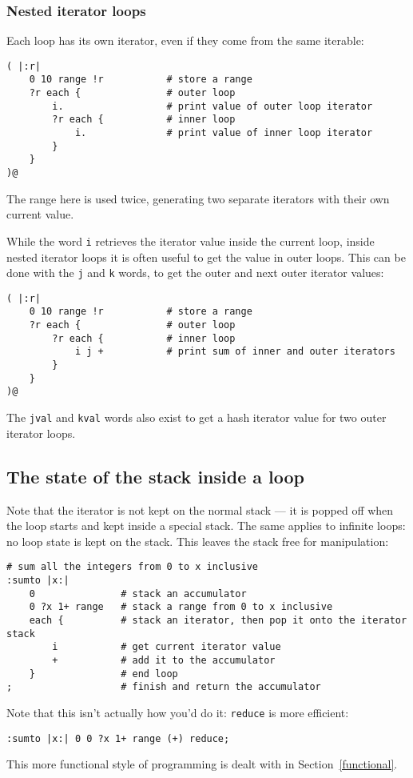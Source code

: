 \subsubsection{Nested iterator loops}
\label{nestit}
Each loop has its own iterator, even if they come from the same iterable:
\begin{lstlisting}
( |:r|
    0 10 range !r           # store a range
    ?r each {               # outer loop
        i.                  # print value of outer loop iterator
        ?r each {           # inner loop
            i.              # print value of inner loop iterator
        }
    }
)@
\end{lstlisting}
The range here is used twice, generating two separate iterators with
their own current value.

While the word \texttt{i} retrieves the iterator value inside the current
loop, inside nested iterator loops it is often useful to get the value
in outer loops. This can be done with the \texttt{j} and \texttt{k} words,
to get the outer and next outer iterator values:
\begin{lstlisting}
( |:r|
    0 10 range !r           # store a range
    ?r each {               # outer loop
        ?r each {           # inner loop
            i j +           # print sum of inner and outer iterators
        }
    }
)@  
\end{lstlisting}
The \texttt{jval} and \texttt{kval}
words also exist to get a hash iterator value for two outer iterator loops.

\clearpage  
\subsection{The state of the stack inside a loop}
Note that the iterator is not kept on the normal stack --- it is popped
off when the loop starts and kept inside a special stack. The same
applies to infinite loops: no loop state is kept on the stack. This 
leaves the stack free for manipulation:
\begin{lstlisting}
# sum all the integers from 0 to x inclusive    
:sumto |x:|
    0               # stack an accumulator
    0 ?x 1+ range   # stack a range from 0 to x inclusive
    each {          # stack an iterator, then pop it onto the iterator stack
        i           # get current iterator value
        +           # add it to the accumulator
    }               # end loop
;                   # finish and return the accumulator
\end{lstlisting}
Note that this isn't actually how you'd do it: \texttt{reduce} is
more efficient:
\begin{lstlisting}
:sumto |x:| 0 0 ?x 1+ range (+) reduce;
\end{lstlisting}
This more functional style of programming is dealt with in
Section~\ref{functional}.

